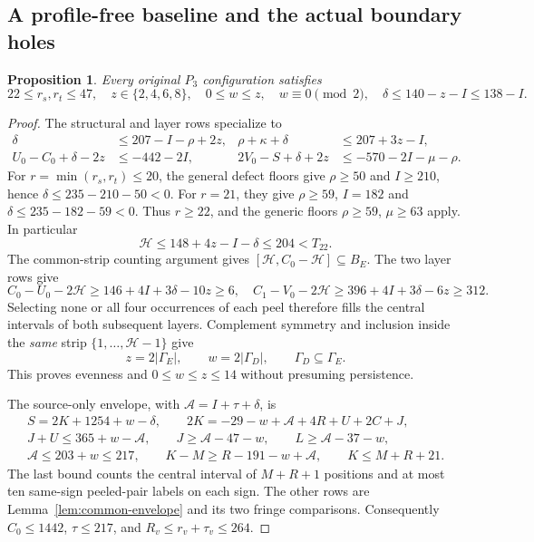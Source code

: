 \documentclass[11pt,letterpaper]{article}
\newtheorem{proposition}[theorem]{Proposition}
\theoremstyle{definition}\newtheorem{definition}[theorem]{Definition}
\begin{document}
\subsection{A profile-free baseline and the actual boundary holes}
\begin{proposition}\label{prop:p3-baseline}
Every original $P_3$ configuration satisfies
\[
22\le r_s,r_t\le47,\quad z\in\{2,4,6,8\},\quad
0\le w\le z,\quad w\equiv0\pmod2,\quad
\delta\le140-z-I\le138-I.
\]
\end{proposition}
\begin{proof}
The structural and layer rows specialize to
\begin{align}
\delta&\le207-I-\rho+2z,&
\rho+\kappa+\delta&\le207+3z-I,\label{eq:p3-initial}\\
U_0-C_0+\delta-2z&\le-442-2I,&
2V_0-S+\delta+2z&\le-570-2I-\mu-\rho.\nonumber
\end{align}
For $r=\min(r_s,r_t)\le20$, the general defect floors give
$\rho\ge50$ and $I\ge210$, hence $\delta\le235-210-50<0$.
For $r=21$, they give $\rho\ge59$, $I=182$ and
$\delta\le235-182-59<0$. Thus $r\ge22$, and the generic floors
$\rho\ge59$, $\mu\ge63$ apply. In particular
\[
\mathcal H\le148+4z-I-\delta\le204<T_{22}.
\]
The common-strip counting argument gives
$[\mathcal H,C_0-\mathcal H]\subseteq B_E$. The two layer rows give
\[
C_0-U_0-2\mathcal H\ge146+4I+3\delta-10z\ge6,
\quad
C_1-V_0-2\mathcal H\ge396+4I+3\delta-6z\ge312.
\]
Selecting none or all four occurrences of each peel therefore fills the
central intervals of both subsequent layers. Complement symmetry and
inclusion inside the \emph{same} strip $\{1,\ldots,\mathcal H-1\}$ give
\[
z=2|\Gamma_E|,\qquad w=2|\Gamma_D|,\qquad
\Gamma_D\subseteq\Gamma_E.
\]
This proves evenness and $0\le w\le z\le14$ without presuming persistence.

The source-only envelope, with $\mathcal A=I+\tau+\delta$, is
\begin{equation}\label{eq:p3-source}
\begin{gathered}
S=2K+1254+w-\delta,\qquad
2K=-29-w+\mathcal A+4R+U+2C+J,\\
J+U\le365+w-\mathcal A,\qquad
J\ge\mathcal A-47-w,\qquad L\ge\mathcal A-37-w,\\
\mathcal A\le203+w\le217,\qquad
K-M\ge R-191-w+\mathcal A,\qquad K\le M+R+21.
\end{gathered}
\end{equation}
The last bound counts the central interval of $M+R+1$ positions and at
most ten same-sign peeled-pair labels on each sign. The other rows are
Lemma~\ref{lem:common-envelope} and its two fringe comparisons.
Consequently $C_0\le1442$, $\tau\le217$, and
$R_v\le r_v+\tau_v\le264$.


\end{proof}
\end{document}
